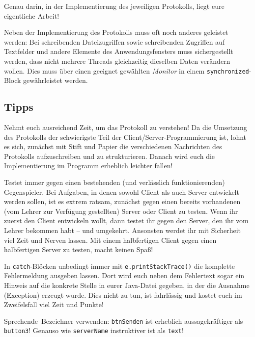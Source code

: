 Genau darin, in der Implementierung des jeweiligen Protokolls, liegt eure
eigentliche Arbeit!

Neben der Implementierung des Protokolls muss oft noch anderes geleistet
werden: Bei schreibenden Dateizugriffen sowie schreibenden Zugriffen auf
Textfelder und andere Elemente des Anwendungsfensters muss sichergestellt
werden, dass nicht mehrere Threads gleichzeitig dieselben Daten verändern
wollen. Dies muss über einen geeignet gewählten \emph{Monitor} in einem
\lstinline|synchronized|-Block gewährleistet werden.

\subsection{Tipps}

\begin{compactitem}
\item Nehmt euch ausreichend Zeit, um das Protokoll zu verstehen! Da die
Umsetzung des Protokolls der schwierigste Teil der Client/Server-Programmierung
ist, lohnt es sich, zunächst mit Stift und Papier die verschiedenen Nachrichten
des Protokolls aufzuschreiben und zu strukturieren. Danach wird euch die
Implementierung im Programm erheblich leichter fallen!

\item Testet immer gegen einen bestehenden (und verlässlich funktionierenden)
\glqq Gegenspieler\grqq . Bei Aufgaben, in denen sowohl Client als auch Server
entwickelt werden sollen, ist es extrem ratsam, zunächst gegen einen bereits
vorhandenen (vom Lehrer zur Verfügung gestellten) Server oder Client zu testen.
Wenn ihr zuerst den Client entwickeln wollt, dann testet ihr gegen den Server,
den ihr vom Lehrer bekommen habt -- und umgekehrt. Ansonsten werdet ihr mit
Sicherheit viel Zeit und Nerven lassen. Mit einem halbfertigen Client gegen
einen halbfertigen Server zu testen, macht keinen Spaß!

\item In \lstinline|catch|-Blöcken unbedingt immer mit
\lstinline|e.printStackTrace()| die komplette Fehlermeldung ausgeben lassen.
Dort wird euch neben dem Fehlertext sogar ein Hinweis auf die konkrete Stelle
in eurer Java-Datei gegeben, in der die Ausnahme (Exception) erzeugt wurde.
Dies nicht zu tun, ist fahrlässig und kostet euch im Zweifelsfall viel Zeit und
Punkte!

\item \glqq Sprechende\grqq\ Bezeichner verwenden: \lstinline|btnSenden| ist
erheblich aussagekräftiger als \lstinline|button3|! Genauso wie
\lstinline|serverName| instruktiver ist als \lstinline|text|!
\end{compactitem}

